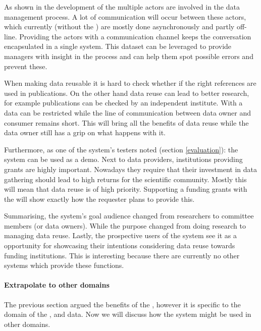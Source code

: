 As shown in the development of the \ivfsystem{} multiple actors are involved in the data management process.
A lot of communication will occur between these actors, which currently (without the \ivfsystem{}) are mostly done asynchronously and partly off-line.
Providing the actors with a communication channel keeps the conversation encapsulated in a single system.
This dataset can be leveraged to provide managers with insight in the process and can help them spot possible errors and prevent these.

When making data reusable it is hard to check whether if the right references are used in publications.
On the other hand data reuse can lead to better research, for example publications can be checked by an independent institute.
With a \ivfsystem{} data can be restricted while the line of communication between data owner and consumer remains short.
This will bring all the benefits of data reuse while the data owner still has a grip on what happens with it.

Furthermore, as one of the system's testers noted (section \ref{evaluation}): the system can be used as a demo.
Next to data providers, institutions providing grants are highly important.
Nowadays they require that their investment in data gathering should lead to high returns for the scientific community.
Mostly this will mean that data reuse is of high priority. 
Supporting a funding grants with the \ivfsystem{} will show exactly how the requester plans to provide this.

Summarising, the system's goal audience changed from researchers to committee members (or data owners).
While the purpose changed from doing research to managing data reuse.
Lastly, the prospective users of the system see it as a opportunity for showcasing their intentions considering data reuse towards funding institutions.
This is interesting because there are currently no other systems which provide these functions.

\paragraph{Extrapolate to other domains}

The previous section argued the benefits of the \ivfsystem{}, however it is specific to the domain of the \projectdata{}, \ie{} \IVF{} and \PRN{} data.
Now we will discuss how the system might be used in other domains.

